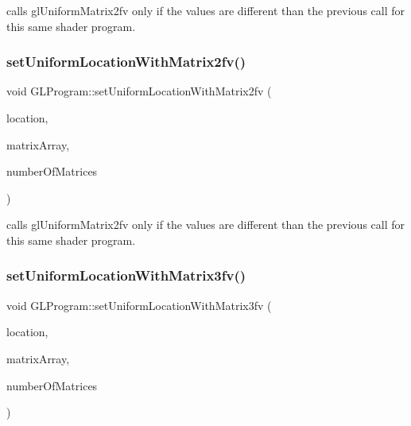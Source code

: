 calls gl\+Uniform\+Matrix2fv only if the values are different than the previous call for this same shader program. \mbox{\label{classGLProgram_a088e08492735e31f94ae29161f6e02d0}} 
\subsubsection{\texorpdfstring{set\+Uniform\+Location\+With\+Matrix2fv()}{setUniformLocationWithMatrix2fv()}\hspace{0.1cm}{\footnotesize\ttfamily [2/2]}}
{\footnotesize\ttfamily void G\+L\+Program\+::set\+Uniform\+Location\+With\+Matrix2fv (\begin{DoxyParamCaption}\item[{G\+Lint}]{location,  }\item[{const G\+Lfloat $\ast$}]{matrix\+Array,  }\item[{unsigned int}]{number\+Of\+Matrices }\end{DoxyParamCaption})}

calls gl\+Uniform\+Matrix2fv only if the values are different than the previous call for this same shader program. \mbox{\label{classGLProgram_a9a9ffe60dcf17ff4fa75d838117f4e93}} 
\subsubsection{\texorpdfstring{set\+Uniform\+Location\+With\+Matrix3fv()}{setUniformLocationWithMatrix3fv()}\hspace{0.1cm}{\footnotesize\ttfamily [1/2]}}
{\footnotesize\ttfamily void G\+L\+Program\+::set\+Uniform\+Location\+With\+Matrix3fv (\begin{DoxyParamCaption}\item[{G\+Lint}]{location,  }\item[{const G\+Lfloat $\ast$}]{matrix\+Array,  }\item[{unsigned int}]{number\+Of\+Matrices }\end{DoxyParamCaption})}

